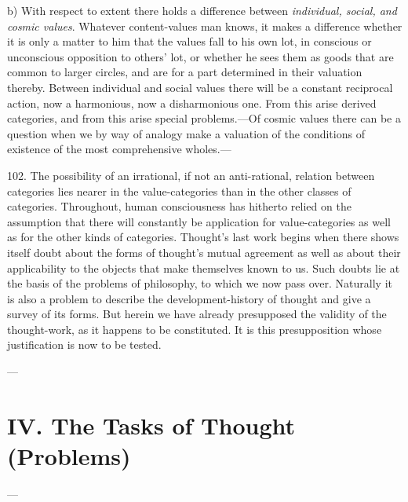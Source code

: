 \documentclass[12pt,a4paper]{book}
\newcommand{\opage}[1]{\marginnote{\footnotesize\textit{[#1]}}}
\begin{document}
b) With respect to extent there holds a difference between \emph{individual,
social, and cosmic values}. Whatever content-values man knows, it makes a
difference whether it is only a matter to him that the values fall to his own
lot, in conscious or unconscious opposition to others' lot, or whether he sees
them as goods that are common to larger circles, and are for a part determined
in their valuation thereby. Between individual and social values there will be
a constant reciprocal action, now a harmonious, now a disharmonious one. From
this arise derived categories, and from this arise special problems.---Of
cosmic values there can be a question when we by way of analogy make a
valuation of the conditions of existence of the most comprehensive wholes.---

102. The possibility of an irrational, if not an anti-rational, relation
between categories lies nearer in the value-categories than in the other
classes of categories. Throughout, human consciousness has hitherto relied on
the assumption that there will constantly be application for value-categories
as well as for the other kinds of categories. Thought's last work begins when
there shows itself doubt about the forms of thought's mutual agreement as well
as about their applicability to the objects that make themselves known to us.
Such doubts lie at the basis of the problems of philosophy, to which we now
pass over. Naturally it is also a problem to \opage{245}describe the development-history
of thought and give a survey of its forms. But herein we have already
presupposed the validity of the thought-work, as it happens to be
constituted. It is this presupposition whose justification is now to be
tested.

\begin{center}---\end{center}

\chapter*{IV. The Tasks of Thought (Problems)}
\label{ch:opgaver}

\begin{center}---\end{center}
\end{document}
